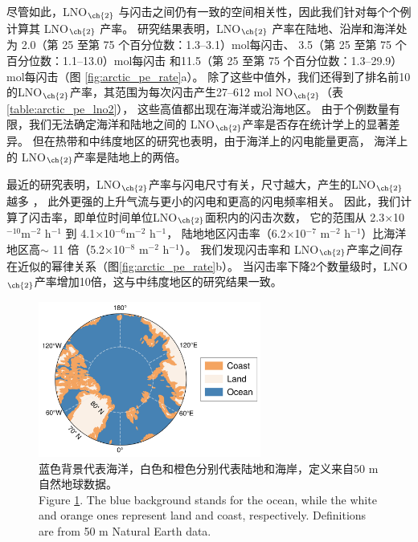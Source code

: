 尽管如此，LNO$_{\ch{2}}$ 与闪击之间仍有一致的空间相关性，因此我们针对每个个例计算其 LNO$_{\ch{2}}$ 产率。
研究结果表明，LNO$_{\ch{2}}$ 产率在陆地、沿岸和海洋处为 2.0（第 25 至第 75 个百分位数：1.3--3.1）mol每闪击、
3.5（第 25 至第 75 个百分位数：1.1--13.0）mol每闪击
和11.5（第 25 至第 75 个百分位数：1.3--29.9）mol每闪击（图 \ref{fig:arctic_pe_rate}a）。
除了这些中值外，我们还得到了排名前10的LNO$_{\ch{2}}$产率，其范围为每次闪击产生27--612 mol NO$_{\ch{2}}$（表\ref{table:arctic_pe_lno2}），
这些高值都出现在海洋或沿海地区。
由于个例数量有限，我们无法确定海洋和陆地之间的 LNO$_{\ch{2}}$产率是否存在统计学上的显著差异。
但在热带和中纬度地区的研究也表明，由于海洋上的闪电能量更高\citep{Beirle.2014,Hutchins.2013}，
海洋上的 LNO$_{\ch{2}}$产率是陆地上的两倍\citep{Marais.2018,Allen.2019,Bucsela.2019}。

最近的研究表明，LNO$_{\ch{2}}$产率与闪电尺寸有关，尺寸越大，产生的LNO$_{\ch{2}}$越多 \citep{Huntrieser.2008,Marais.2018}，
此外更强的上升气流与更小的闪电和更高的闪电频率相关\citep{Bruning.2013,Bruning.2015,Mecikalski.2015}。
因此，我们计算了闪击率，即单位时间单位LNO$_{\ch{2}}$面积内的闪击次数，
它的范围从 2.3$\times$10$^{-10} $m$^{-2}$ h$^{-1}$ 到 4.1$\times$10$^{-6} $m$^{-2 }$ h$^{-1}$，
陆地地区闪击率（6.2$\times$10$^{-7}$ m$^{-2}$ h$^{-1}$）比海洋地区高$\sim$ 11 倍（5.2$\times$10$^{-8}$ m$^{-2}$ h$^{-1}$）。
我们发现闪击率和 LNO$_{\ch{2}}$产率之间存在近似的幂律关系（图\ref{fig:arctic_pe_rate}b）。
当闪击率下降2个数量级时，LNO$_{\ch{2}}$产率增加10倍，这与中纬度地区的研究结果一致\citep{Bucsela.2019,Zhang.2020b}。

\begin{figure}[H]
\centering
\includegraphics[width=0.65\textwidth]{./figures/arctic_region_mask.png}
\caption{
蓝色背景代表海洋，白色和橙色分别代表陆地和海岸，定义来自50 m自然地球数据。 \\
Figure \ref{fig:arctic_region_mask}. The blue background stands for the ocean, while the white and orange ones represent land
and coast, respectively. Definitions are from 50 m Natural Earth data.
}
\label{fig:arctic_region_mask}
\end{figure}


